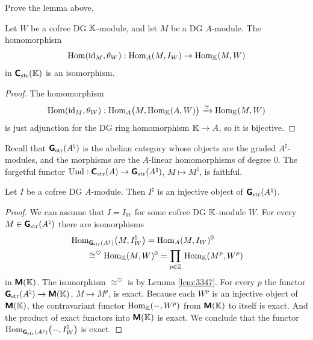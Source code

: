 \begin{exer}
Prove the lemma above. 
\end{exer}

\begin{lem} \label{lem:3347}
Let $W$ be a cofree DG $\mathbb{K}$-module, and let $M$ be a DG $A$-module.
The homomorphism 
\[ \operatorname{Hom}(\operatorname{id}_M, \theta_W) : \operatorname{Hom}_{A}(M, I_W) \to 
\operatorname{Hom}_{\mathbb{K}}(M, W) \]
in $\boldsymbol{\mathsf{C}}_{\mathrm{str}}(\mathbb{K})$ is an isomorphism. 
\end{lem}

\begin{proof}
The homomorphism
\[ \operatorname{Hom}(\operatorname{id}_M, \theta_W) :
\operatorname{Hom}_{A} \bigl( M,  \operatorname{Hom}_{\mathbb{K}}(A, W) \bigr) \xrightarrow{\simeq} 
\operatorname{Hom}_{\mathbb{K}}(M, W) \]
is just adjunction for the DG ring homomorphism $\mathbb{K} \to A$, so it is bijective. 
\end{proof}

Recall that $\boldsymbol{\mathsf{G}}_{\mathrm{str}}(A^{\natural})$ is the abelian category whose 
objects are the graded $A^{\natural}$-modules, and the morphisms are the 
$A$-linear homomorphisms of degree $0$. The forgetful functor 
$\operatorname{Und} : \boldsymbol{\mathsf{C}}_{\mathrm{str}}(A) \to \boldsymbol{\mathsf{G}}_{\mathrm{str}}(A^{\natural})$, 
$M \mapsto M^{\natural}$, is faithful. 

\begin{lem} \label{lem:1770}
Let $I$ be a cofree DG $A$-module. Then $I^{\natural}$ is an injective object 
of $\boldsymbol{\mathsf{G}}_{\mathrm{str}}(A^{\natural})$.
\end{lem}

\begin{proof}
We can assume that $I = I_W$ for some cofree DG $\mathbb{K}$-module $W$. 
For every  $M \in \boldsymbol{\mathsf{G}}_{\mathrm{str}}(A^{\natural})$ there are isomorphisms 
\[ \begin{aligned}
& \operatorname{Hom}_{\boldsymbol{\mathsf{G}}_{\mathrm{str}}(A^{\natural})} \bigl( M, I_W^{\natural} 
\bigr) 
= \operatorname{Hom}_{A}(M, I_W)^0  
\\
& \qquad \cong^{\heartsuit} \operatorname{Hom}_{\mathbb{K}}(M, W)^0 =
\prod_{p \in \mathbb{Z}} \, \operatorname{Hom}_{\mathbb{K}}(M^{p}, W^p) 
\end{aligned} \]
in $\boldsymbol{\mathsf{M}}(\mathbb{K})$.
The isomorphism $\cong^{\heartsuit}$ is by Lemma \ref{lem:3347}. 
For every $p$  the functor
$\boldsymbol{\mathsf{G}}_{\mathrm{str}}(A^{\natural}) \to \boldsymbol{\mathsf{M}}(\mathbb{K})$,  $M \mapsto M^p$, is 
exact. Because each $W^p$ is an injective object of $\boldsymbol{\mathsf{M}}(\mathbb{K})$, 
the contravariant functor $\operatorname{Hom}_{\mathbb{K}}(-, W^p)$
from $\boldsymbol{\mathsf{M}}(\mathbb{K})$ to itself is exact. 
And the product of exact functors into $\boldsymbol{\mathsf{M}}(\mathbb{K})$ is exact. We conclude 
that 
the functor 
$\operatorname{Hom}_{\boldsymbol{\mathsf{G}}_{\mathrm{str}}(A^{\natural})} \bigl( -, I_W^{\natural} \bigr)$
is exact. 
\end{proof}


